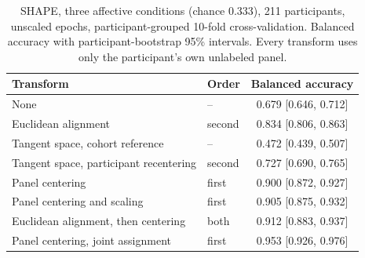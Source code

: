 \begin{table}[t]
\centering
\caption{SHAPE, three affective conditions (chance 0.333), 211 participants, unscaled epochs, participant-grouped 10-fold cross-validation. Balanced accuracy with participant-bootstrap 95\% intervals. Every transform uses only the participant's own unlabeled panel.}
\label{tab:shape}
\begin{tabular}{llc}
\toprule
Transform & Order & Balanced accuracy \\
\midrule
None & -- & 0.679 [0.646, 0.712] \\
Euclidean alignment & second & 0.834 [0.806, 0.863] \\
Tangent space, cohort reference & -- & 0.472 [0.439, 0.507] \\
Tangent space, participant recentering & second & 0.727 [0.690, 0.765] \\
Panel centering & first & 0.900 [0.872, 0.927] \\
Panel centering and scaling & first & 0.905 [0.875, 0.932] \\
Euclidean alignment, then centering & both & 0.912 [0.883, 0.937] \\
Panel centering, joint assignment & first & 0.953 [0.926, 0.976] \\
\bottomrule
\end{tabular}
\end{table}
